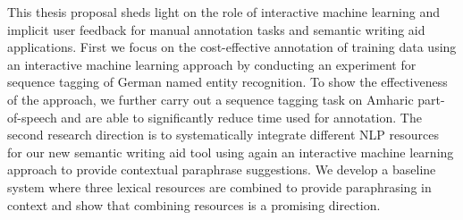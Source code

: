 This thesis proposal sheds light on the role of interactive machine learning and implicit user feedback for manual annotation tasks and semantic writing aid applications. First we focus on the cost-effective annotation of training data using an interactive machine learning approach by conducting an experiment for sequence tagging of German named entity recognition. To show the effectiveness of the approach, we further carry out a sequence tagging task on Amharic part-of-speech and are able to significantly reduce time used for annotation. The second research direction is to systematically integrate different NLP resources for our new semantic writing aid tool using again an interactive machine learning approach to provide contextual paraphrase suggestions. We develop a baseline system where three lexical resources are combined to provide paraphrasing in context and show that combining resources is a promising direction.
